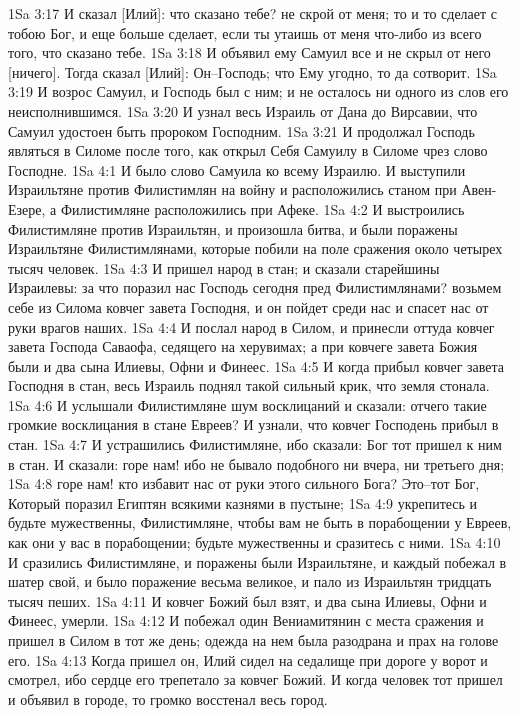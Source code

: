 1Sa 3:17  И сказал [Илий]: что сказано тебе? не скрой от меня; то и то сделает с тобою Бог, и еще больше сделает, если ты утаишь от меня что-либо из всего того, что сказано тебе.
1Sa 3:18  И объявил ему Самуил все и не скрыл от него [ничего]. Тогда сказал [Илий]: Он--Господь; что Ему угодно, то да сотворит.
1Sa 3:19  И возрос Самуил, и Господь был с ним; и не осталось ни одного из слов его неисполнившимся.
1Sa 3:20  И узнал весь Израиль от Дана до Вирсавии, что Самуил удостоен быть пророком Господним.
1Sa 3:21  И продолжал Господь являться в Силоме после того, как открыл Себя Самуилу в Силоме чрез слово Господне.
1Sa 4:1  И было слово Самуила ко всему Израилю. И выступили Израильтяне против Филистимлян на войну и расположились станом при Авен-Езере, а Филистимляне расположились при Афеке.
1Sa 4:2  И выстроились Филистимляне против Израильтян, и произошла битва, и были поражены Израильтяне Филистимлянами, которые побили на поле сражения около четырех тысяч человек.
1Sa 4:3  И пришел народ в стан; и сказали старейшины Израилевы: за что поразил нас Господь сегодня пред Филистимлянами? возьмем себе из Силома ковчег завета Господня, и он пойдет среди нас и спасет нас от руки врагов наших.
1Sa 4:4  И послал народ в Силом, и принесли оттуда ковчег завета Господа Саваофа, седящего на херувимах; а при ковчеге завета Божия были и два сына Илиевы, Офни и Финеес.
1Sa 4:5  И когда прибыл ковчег завета Господня в стан, весь Израиль поднял такой сильный крик, что земля стонала.
1Sa 4:6  И услышали Филистимляне шум восклицаний и сказали: отчего такие громкие восклицания в стане Евреев? И узнали, что ковчег Господень прибыл в стан.
1Sa 4:7  И устрашились Филистимляне, ибо сказали: Бог тот пришел к ним в стан. И сказали: горе нам! ибо не бывало подобного ни вчера, ни третьего дня;
1Sa 4:8  горе нам! кто избавит нас от руки этого сильного Бога? Это--тот Бог, Который поразил Египтян всякими казнями в пустыне;
1Sa 4:9  укрепитесь и будьте мужественны, Филистимляне, чтобы вам не быть в порабощении у Евреев, как они у вас в порабощении; будьте мужественны и сразитесь с ними.
1Sa 4:10  И сразились Филистимляне, и поражены были Израильтяне, и каждый побежал в шатер свой, и было поражение весьма великое, и пало из Израильтян тридцать тысяч пеших.
1Sa 4:11  И ковчег Божий был взят, и два сына Илиевы, Офни и Финеес, умерли.
1Sa 4:12  И побежал один Вениамитянин с места сражения и пришел в Силом в тот же день; одежда на нем была разодрана и прах на голове его.
1Sa 4:13  Когда пришел он, Илий сидел на седалище при дороге у ворот и смотрел, ибо сердце его трепетало за ковчег Божий. И когда человек тот пришел и объявил в городе, то громко восстенал весь город.
